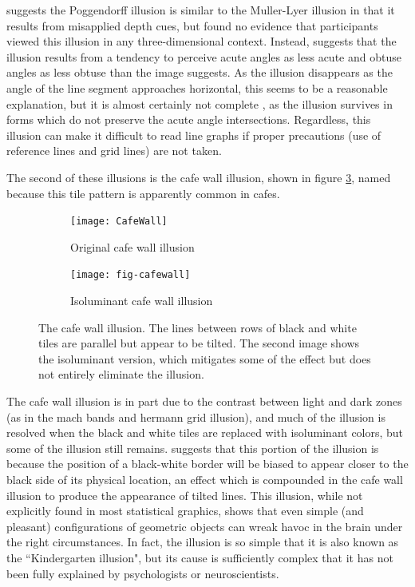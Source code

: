 \documentclass[11pt]{isuthesis}\usepackage[]{graphicx}\usepackage[]{color}
\begin{document}
\citet{gregory1963distortion, gregory1997knowledge} suggests the Poggendorff illusion is similar to the Muller-Lyer illusion in that it results from misapplied depth cues, but \citet{green1963poggendorff, ward1977case} found no evidence that participants viewed this illusion in any three-dimensional context. Instead, \citet{green1963poggendorff} suggests that the illusion results from a tendency to perceive acute angles as less acute and obtuse angles as less obtuse than the image suggests. As the illusion disappears as the angle of the line segment approaches horizontal, this seems to be a reasonable explanation, but it is almost certainly not complete \citep{morgan1999poggendorff}, as the illusion survives in forms which do not preserve the acute angle intersections. Regardless, this illusion can make it difficult to read line graphs \citep{amer2005bias, poulton1985geometric} if proper precautions (use of reference lines and grid lines) are not taken.

The second of these illusions is the cafe wall illusion, shown in figure \ref{fig:cafewall}, named because this tile pattern is apparently common in cafes. 



\begin{figure}[htbp]\centering
\hfil
\begin{subfigure}[b]{.4\linewidth}\centering
  \texttt{[image: CafeWall]}
  \caption{Original cafe wall illusion}\label{fig:CafeWallOrig}
\end{subfigure}\hfil
\begin{subfigure}[b]{.4\linewidth}\centering
  \texttt{[image: fig-cafewall]}
  \caption{Isoluminant cafe wall illusion}\label{fig:CafeWallIso}
\end{subfigure}\hfil
\caption[Cafe wall illusion]{The cafe wall illusion. The lines between rows of black and white tiles are parallel but appear to be tilted. The second image shows the isoluminant version, which mitigates some of the effect but does not entirely eliminate the illusion.}\label{fig:cafewall}
\end{figure}

The cafe wall illusion is in part due to the contrast between light and dark zones (as in the mach bands and hermann grid illusion), and much of the illusion is resolved when the black and white tiles are replaced with isoluminant colors, but some of the illusion still remains. \citet{westheimer2007irradiation} suggests that this portion of the illusion is because the position of a black-white border will be biased to appear closer to the black side of its physical location, an effect which is compounded in the cafe wall illusion to produce the appearance of tilted lines. This illusion, while not explicitly found in most statistical graphics, shows that even simple (and pleasant) configurations of geometric objects can wreak havoc in the brain under the right circumstances. In fact, the illusion is so simple that it is also known as the ``Kindergarten illusion", but its cause is sufficiently complex that it has not been fully explained by psychologists or neuroscientists. 
\end{document}
